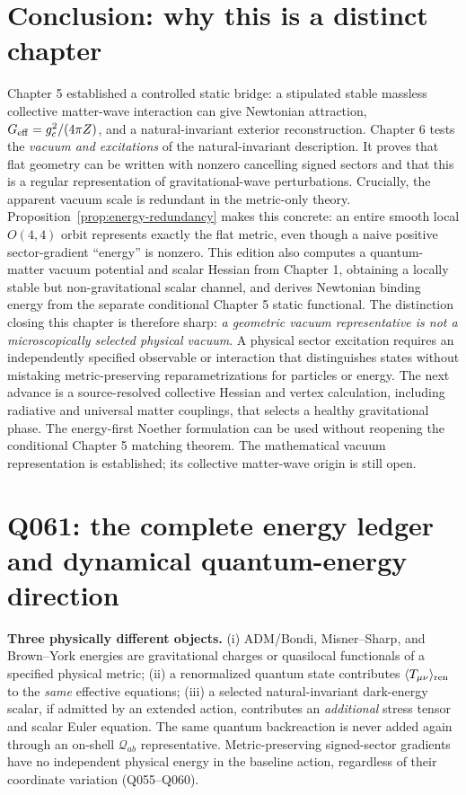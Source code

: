 \documentclass[11pt,a4paper]{article}
\theoremstyle{definition}\newtheorem{definition}[theorem]{Definition}
\theoremstyle{remark}\newtheorem{remark}[theorem]{Remark}
\begin{document}
\section{Conclusion: why this is a distinct chapter}
Chapter 5 established a controlled static bridge: a stipulated stable massless collective matter-wave interaction can give Newtonian attraction, $G_{\rm eff}=g_c^2/(4\pi Z)$, and a natural-invariant exterior reconstruction. Chapter 6 tests the \emph{vacuum and excitations} of the natural-invariant description. It proves that flat geometry can be written with nonzero cancelling signed sectors and that this is a regular representation of gravitational-wave perturbations. Crucially, the apparent vacuum scale is redundant in the metric-only theory. Proposition~\ref{prop:energy-redundancy} makes this concrete: an entire smooth local $O(4,4)$ orbit represents exactly the flat metric, even though a naive positive sector-gradient ``energy'' is nonzero. This edition also computes a quantum-matter vacuum potential and scalar Hessian from Chapter 1, obtaining a locally stable but non-gravitational scalar channel, and derives Newtonian binding energy from the separate conditional Chapter 5 static functional. The distinction closing this chapter is therefore sharp: \emph{a geometric vacuum representative is not a microscopically selected physical vacuum}. A physical sector excitation requires an independently specified observable or interaction that distinguishes states without mistaking metric-preserving reparametrizations for particles or energy. The next advance is a source-resolved collective Hessian and vertex calculation, including radiative and universal matter couplings, that selects a healthy gravitational phase. The energy-first Noether formulation can be used without reopening the conditional Chapter 5 matching theorem. The mathematical vacuum representation is established; its collective matter-wave origin is still open.



\section{Q061: the complete energy ledger and dynamical quantum-energy direction}
\noindent\textbf{Three physically different objects.} (i) ADM/Bondi, Misner--Sharp, and Brown--York energies are gravitational charges or quasilocal functionals of a specified physical metric; (ii) a renormalized quantum state contributes $\langle T_{\mu\nu}\rangle_{\rm ren}$ to the \emph{same} effective equations; (iii) a selected natural-invariant dark-energy scalar, if admitted by an extended action, contributes an \emph{additional} stress tensor and scalar Euler equation. The same quantum backreaction is never added again through an on-shell $\mathcal Q_{ab}$ representative. Metric-preserving signed-sector gradients have no independent physical energy in the baseline action, regardless of their coordinate variation (Q055--Q060).
\end{document}
